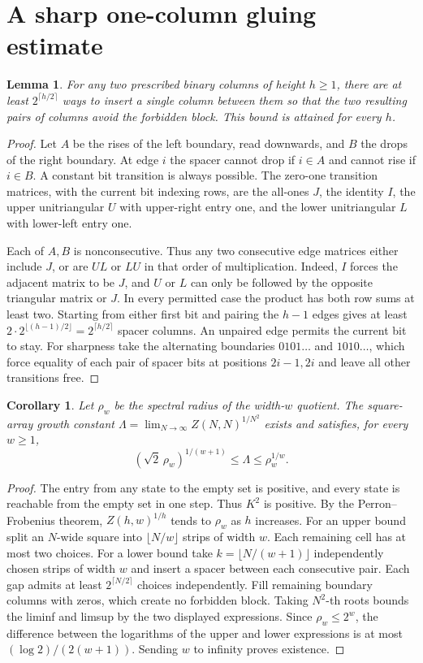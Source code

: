 \documentclass[11pt]{article}
\newtheorem{lemma}[theorem]{Lemma}
\newtheorem{corollary}[theorem]{Corollary}
\begin{document}
\section{A sharp one-column gluing estimate}
\begin{lemma}
For any two prescribed binary columns of height $h\ge1$, there are at least $2^{\lceil h/2\rceil}$ ways to insert a single column between them so that the two resulting pairs of columns avoid the forbidden block. This bound is attained for every $h$.
\end{lemma}
\begin{proof}
Let $A$ be the rises of the left boundary, read downwards, and $B$ the drops of the right boundary. At edge $i$ the spacer cannot drop if $i\in A$ and cannot rise if $i\in B$. A constant bit transition is always possible. The zero-one transition matrices, with the current bit indexing rows, are the all-ones $J$, the identity $I$, the upper unitriangular $U$ with upper-right entry one, and the lower unitriangular $L$ with lower-left entry one.

Each of $A,B$ is nonconsecutive. Thus any two consecutive edge matrices either include $J$, or are $UL$ or $LU$ in that order of multiplication. Indeed, $I$ forces the adjacent matrix to be $J$, and $U$ or $L$ can only be followed by the opposite triangular matrix or $J$. In every permitted case the product has both row sums at least two. Starting from either first bit and pairing the $h-1$ edges gives at least $2\cdot 2^{\lfloor(h-1)/2\rfloor}=2^{\lceil h/2\rceil}$ spacer columns. An unpaired edge permits the current bit to stay. For sharpness take the alternating boundaries $0101\ldots$ and $1010\ldots$, which force equality of each pair of spacer bits at positions $2i-1,2i$ and leave all other transitions free.
\end{proof}

\begin{corollary}
Let $\rho_w$ be the spectral radius of the width-$w$ quotient. The square-array growth constant $\Lambda=\lim_{N\to\infty}Z(N,N)^{1/N^2}$ exists and satisfies, for every $w\ge1$,
\[
 (\sqrt{2}\,\rho_w)^{1/(w+1)}\leq \Lambda\leq \rho_w^{1/w}.
\]
\end{corollary}
\begin{proof}
The entry from any state to the empty set is positive, and every state is reachable from the empty set in one step. Thus $K^2$ is positive. By the Perron--Frobenius theorem, $Z(h,w)^{1/h}$ tends to $\rho_w$ as $h$ increases. For an upper bound split an $N$-wide square into $\lfloor N/w\rfloor$ strips of width $w$. Each remaining cell has at most two choices. For a lower bound take $k=\lfloor N/(w+1)\rfloor$ independently chosen strips of width $w$ and insert a spacer between each consecutive pair. Each gap admits at least $2^{\lceil N/2\rceil}$ choices independently. Fill remaining boundary columns with zeros, which create no forbidden block. Taking $N^2$-th roots bounds the liminf and limsup by the two displayed expressions. Since $\rho_w\leq2^w$, the difference between the logarithms of the upper and lower expressions is at most $(\log2)/(2(w+1))$. Sending $w$ to infinity proves existence.
\end{proof}
\end{document}
